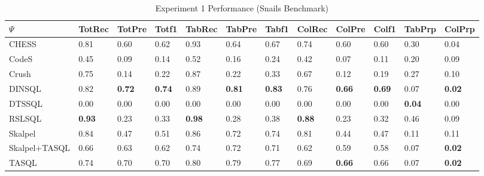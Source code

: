 \begin{table*}
\caption{Experiment 1 Performance (Snails Benchmark)}
\label{tab:exp1-snails}
\begin{tabular}{llllllllllll}
\toprule
$\Psi$ & TotRec & TotPre & Totf1 & TabRec & TabPre & Tabf1 & ColRec & ColPre & Colf1 & TabPrp & ColPrp \\
\midrule
CHESS & 0.81 & 0.60 & 0.62 & 0.93 & 0.64 & 0.67 & 0.74 & 0.60 & 0.60 & 0.30 & 0.04 \\
CodeS & 0.45 & 0.09 & 0.14 & 0.52 & 0.16 & 0.24 & 0.42 & 0.07 & 0.11 & 0.20 & 0.09 \\
Crush & 0.75 & 0.14 & 0.22 & 0.87 & 0.22 & 0.33 & 0.67 & 0.12 & 0.19 & 0.27 & 0.10 \\
DINSQL & 0.82 & \textbf{0.72} & \textbf{0.74} & 0.89 & \textbf{0.81} & \textbf{0.83} & 0.76 & \textbf{0.66} & \textbf{0.69} & 0.07 & \textbf{0.02} \\
DTSSQL & 0.00 & 0.00 & 0.00 & 0.00 & 0.00 & 0.00 & 0.00 & 0.00 & 0.00 & \textbf{0.04} & 0.00 \\
RSLSQL & \textbf{0.93} & 0.23 & 0.33 & \textbf{0.98} & 0.28 & 0.38 & \textbf{0.88} & 0.23 & 0.32 & 0.46 & 0.09 \\
Skalpel & 0.84 & 0.47 & 0.51 & 0.86 & 0.72 & 0.74 & 0.81 & 0.44 & 0.47 & 0.11 & 0.11 \\
Skalpel+TASQL & 0.66 & 0.63 & 0.62 & 0.74 & 0.72 & 0.71 & 0.62 & 0.59 & 0.58 & 0.07 & \textbf{0.02} \\
TASQL & 0.74 & 0.70 & 0.70 & 0.80 & 0.79 & 0.77 & 0.69 & \textbf{0.66} & 0.66 & 0.07 & \textbf{0.02} \\
\bottomrule
\end{tabular}
\end{table*}

